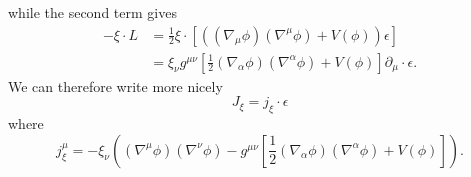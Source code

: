 \documentclass[11pt,letterpaper]{article}
\newcommand{\LP}{\left(}
\newcommand{\RP}{\right)}
\newcommand{\D}{\partial}
\begin{document}
while the second term gives \begin{equation}
\begin{aligned}
- \xi \cdot L & = \frac{1}{2} \xi \cdot \left[ \LP (\nabla_\mu \phi) (\nabla^\mu \phi) + V(\phi) \RP \epsilon \right] \\
& =  \xi_\nu g^{\mu \nu} \left[ \frac{1}{2} (\nabla_\alpha \phi) (\nabla^\alpha \phi) + V(\phi)  \right] \D_\mu \cdot \epsilon.
\end{aligned}
\end{equation}
We can therefore write more nicely \begin{equation}
J_\xi = j_\xi \cdot \epsilon
\end{equation}
where \begin{equation}
j_\xi^\mu = - \xi_\nu \LP  (\nabla^\mu \phi) (\nabla^\nu \phi) -  g^{\mu \nu} \left[ \frac{1}{2} (\nabla_\alpha \phi) (\nabla^\alpha \phi) + V(\phi)  \right] \RP .
\end{equation}
\end{document}
